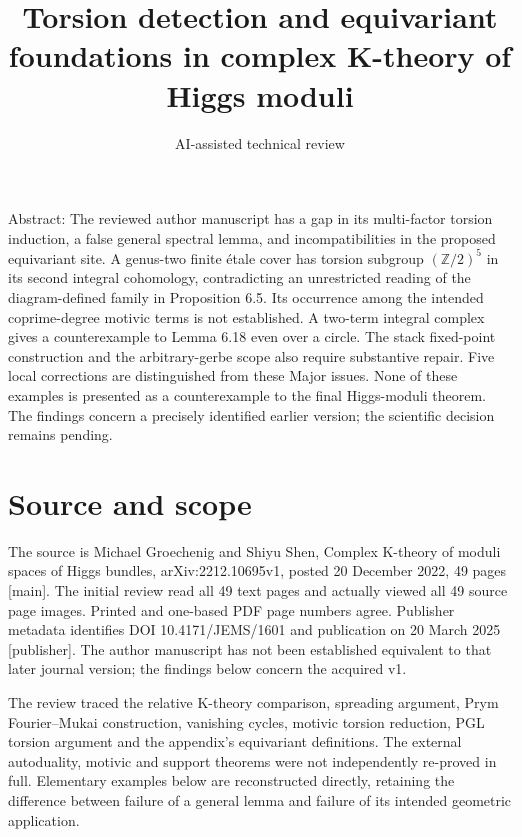 \documentclass[10pt]{article}
\title{Torsion detection and equivariant foundations
in complex K-theory of Higgs moduli}
\author{AI-assisted technical review}
\date{}
\begin{document}
\maketitle
Abstract: The reviewed author manuscript has a gap in its multi-factor torsion induction, a false general spectral lemma, and incompatibilities in the proposed equivariant site. A genus-two finite étale cover has torsion subgroup \((\mathbb Z/2)^5\) in its second integral cohomology, contradicting an unrestricted reading of the diagram-defined family in Proposition 6.5. Its occurrence among the intended coprime-degree motivic terms is not established. A two-term integral complex gives a counterexample to Lemma 6.18 even over a circle. The stack fixed-point construction and the arbitrary-gerbe scope also require substantive repair. Five local corrections are distinguished from these Major issues. None of these examples is presented as a counterexample to the final Higgs-moduli theorem. The findings concern a precisely identified earlier version; the scientific decision remains pending.\par
\section*{Source and scope}
The source is Michael Groechenig and Shiyu Shen, Complex K-theory of moduli spaces of Higgs bundles, arXiv:2212.10695v1, posted 20 December 2022, 49 pages [main]. The initial review read all 49 text pages and actually viewed all 49 source page images. Printed and one-based PDF page numbers agree. Publisher metadata identifies DOI 10.4171/JEMS/1601 and publication on 20 March 2025 [publisher]. The author manuscript has not been established equivalent to that later journal version; the findings below concern the acquired v1.\par
The review traced the relative K-theory comparison, spreading argument, Prym Fourier–Mukai construction, vanishing cycles, motivic torsion reduction, PGL torsion argument and the appendix’s equivariant definitions. The external autoduality, motivic and support theorems were not independently re-proved in full. Elementary examples below are reconstructed directly, retaining the difference between failure of a general lemma and failure of its intended geometric application.\par
\end{document}
